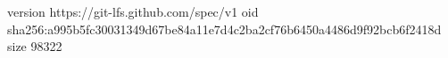 version https://git-lfs.github.com/spec/v1
oid sha256:a995b5fc30031349d67be84a11e7d4c2ba2cf76b6450a4486d9f92bcb6f2418d
size 98322
